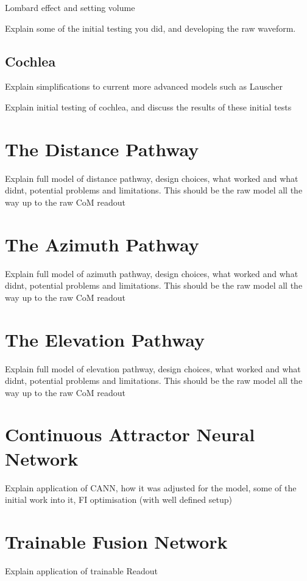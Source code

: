 Lombard effect and setting volume

Explain some of the initial testing you did, and developing the raw waveform.

\subsection{Cochlea}

Explain simplifications to current more advanced models such as Lauscher

Explain initial testing of cochlea, and discuss the results of these initial tests

\section{The Distance Pathway}

Explain full model of distance pathway, design choices, what worked and what didnt, potential problems and limitations. This should be the raw model all the way up to the raw CoM readout 

\section{The Azimuth Pathway}

Explain full model of azimuth pathway, design choices, what worked and what didnt, potential problems and limitations. This should be the raw model all the way up to the raw CoM readout 

\section{The Elevation Pathway}

Explain full model of elevation pathway, design choices, what worked and what didnt, potential problems and limitations. This should be the raw model all the way up to the raw CoM readout 

\section{Continuous Attractor Neural Network}

Explain application of CANN, how it was adjusted for the model, some of the initial work into it, FI optimisation (with well defined setup)

\section{Trainable Fusion Network}

Explain application of trainable Readout







